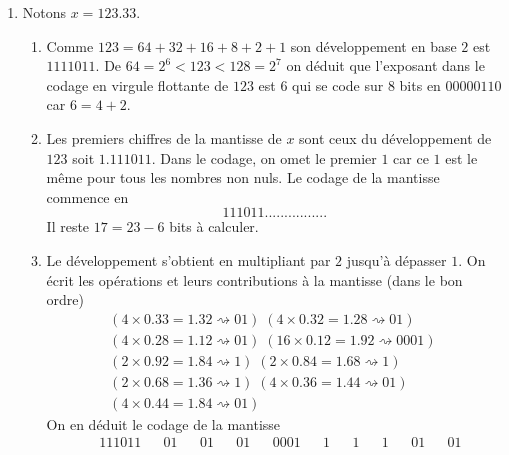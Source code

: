 \begin{enumerate}
  \item Notons $x=123.33$.
\begin{enumerate}
  \item Comme $123 = 64 + 32 + 16 + 8 + 2 + 1$ son développement en base $2$ est $1111011$. De $64 = 2^6 < 123 < 128 = 2^7$ on déduit que l'exposant dans le codage en virgule flottante de $123$ est $6$ qui se code sur 8 bits en $00000110$ car $6=4+2$.
  \item Les premiers chiffres de la mantisse de $x$ sont ceux du développement de $123$ soit $1.111011$. Dans le codage, on omet le premier $1$ car ce $1$ est le même pour tous les nombres non nuls. Le codage de la mantisse commence en 
  \begin{displaymath}
    111011................
  \end{displaymath}
Il reste $17 = 23 -6$ bits à calculer.
  \item Le développement s'obtient en multipliant par $2$ jusqu'à dépasser $1$. On écrit les opérations et leurs contributions à la mantisse (dans le bon ordre) 
\begin{multline*}
\left( 4\times 0.33 = 1.32 \rightsquigarrow 01\right)\;
\left( 4\times 0.32 = 1.28 \rightsquigarrow 01\right)\;\\
\left( 4\times 0.28 = 1.12 \rightsquigarrow 01\right)\;
\left( 16\times 0.12 = 1.92 \rightsquigarrow 0001\right)\;\\
\left( 2\times 0.92 = 1.84 \rightsquigarrow 1\right)\;
\left( 2\times 0.84 = 1.68 \rightsquigarrow 1\right)\;\\
\left( 2\times 0.68 = 1.36 \rightsquigarrow 1\right)\;
\left( 4\times 0.36 = 1.44 \rightsquigarrow 01\right)\;\\
\left( 4\times 0.44 = 1.84 \rightsquigarrow 01\right)\;
\end{multline*}
On en déduit le codage de la mantisse
\begin{align*}
  &111011& & 01& & 01& & 01& & 0001& & 1& & 1& & 1& & 01& & 01
\end{align*}

\end{enumerate}
\end{enumerate}
